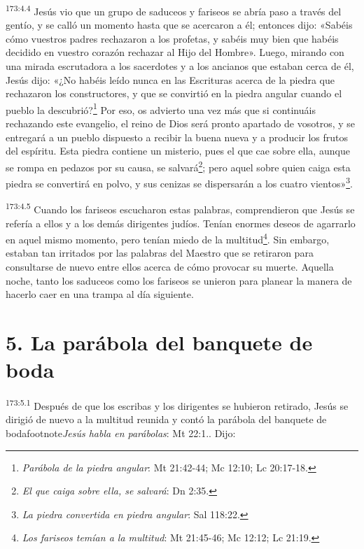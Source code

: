 \par
\textsuperscript{173:4.4} Jesús vio que un grupo de saduceos y fariseos se abría paso a través del gentío, y se calló un momento hasta que se acercaron a él; entonces dijo: «Sabéis cómo vuestros padres rechazaron a los profetas, y sabéis muy bien que habéis decidido en vuestro corazón rechazar al Hijo del Hombre». Luego, mirando con una mirada escrutadora a los sacerdotes y a los ancianos que estaban cerca de él, Jesús dijo: «¿No habéis leído nunca en las Escrituras acerca de la piedra que rechazaron los constructores, y que se convirtió en la piedra angular cuando el pueblo la descubrió?\footnote{\textit{Parábola de la piedra angular}: Mt 21:42-44; Mc 12:10; Lc 20:17-18.} Por eso, os advierto una vez más que si continuáis rechazando este evangelio, el reino de Dios será pronto apartado de vosotros, y se entregará a un pueblo dispuesto a recibir la buena nueva y a producir los frutos del espíritu. Esta piedra contiene un misterio, pues el que cae sobre ella, aunque se rompa en pedazos por su causa, se salvará\footnote{\textit{El que caiga sobre ella, se salvará}: Dn 2:35.}; pero aquel sobre quien caiga esta piedra se convertirá en polvo, y sus cenizas se dispersarán a los cuatro vientos»\footnote{\textit{La piedra convertida en piedra angular}: Sal 118:22.}.

\par
\textsuperscript{173:4.5} Cuando los fariseos escucharon estas palabras, comprendieron que Jesús se refería a ellos y a los demás dirigentes judíos. Tenían enormes deseos de agarrarlo en aquel mismo momento, pero tenían miedo de la multitud\footnote{\textit{Los fariseos temían a la multitud}: Mt 21:45-46; Mc 12:12; Lc 21:19.}. Sin embargo, estaban tan irritados por las palabras del Maestro que se retiraron para consultarse de nuevo entre ellos acerca de cómo provocar su muerte. Aquella noche, tanto los saduceos como los fariseos se unieron para planear la manera de hacerlo caer en una trampa al día siguiente.

\section*{5. La parábola del banquete de boda}
\par
\textsuperscript{173:5.1} Después de que los escribas y los dirigentes se hubieron retirado, Jesús se dirigió de nuevo a la multitud reunida y contó la parábola del banquete de bodafootnote{\textit{Jesús habla en parábolas}: Mt 22:1.}. Dijo:

